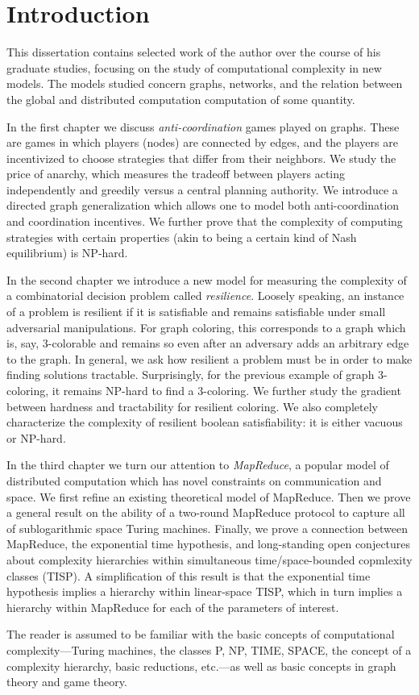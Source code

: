 \chapter{Introduction}
\label{introduction}

This dissertation contains selected work of the author over the course of
his graduate studies, focusing on the study of computational complexity in new
models. The models studied concern graphs, networks, and the relation between
the global and distributed computation computation of some quantity.

In the first chapter we discuss \emph{anti-coordination} games played on
graphs. These are games in which players (nodes) are connected by edges, and
the players are incentivized to choose strategies that differ from their
neighbors. We study the price of anarchy, which measures the tradeoff between
players acting independently and greedily versus a central planning authority.
We introduce a directed graph generalization which allows one to model both
anti-coordination and coordination incentives. We further prove that the
complexity of computing strategies with certain properties (akin to being a
certain kind of Nash equilibrium) is NP-hard.

In the second chapter we introduce a new model for measuring the complexity of
a combinatorial decision problem called \emph{resilience}. Loosely speaking, an
instance of a problem is resilient if it is satisfiable and remains satisfiable
under small adversarial manipulations. For graph coloring, this corresponds to
a graph which is, say, 3-colorable and remains so even after an adversary adds
an arbitrary edge to the graph. In general, we ask how resilient a problem must
be in order to make finding solutions tractable. Surprisingly, for the previous
example of graph 3-coloring, it remains NP-hard to find a 3-coloring. We
further study the gradient between hardness and tractability for resilient
coloring. We also completely characterize the complexity of resilient boolean
satisfiability: it is either vacuous or NP-hard.

In the third chapter we turn our attention to \emph{MapReduce}, a popular model
of distributed computation which has novel constraints on communication and
space. We first refine an existing theoretical model of MapReduce. Then we
prove a general result on the ability of a two-round MapReduce protocol to
capture all of sublogarithmic space Turing machines. Finally, we prove a
connection between MapReduce, the exponential time hypothesis, and
long-standing open conjectures about complexity hierarchies within simultaneous
time/space-bounded copmlexity classes (TISP). A simplification of this result
is that the exponential time hypothesis implies a hierarchy within linear-space
TISP, which in turn implies a hierarchy within MapReduce for each of the
parameters of interest.

The reader is assumed to be familiar with the basic concepts of computational
complexity---Turing machines, the classes P, NP, TIME, SPACE, the concept of a
complexity hierarchy, basic reductions, etc.---as well as basic concepts in
graph theory and game theory. 
